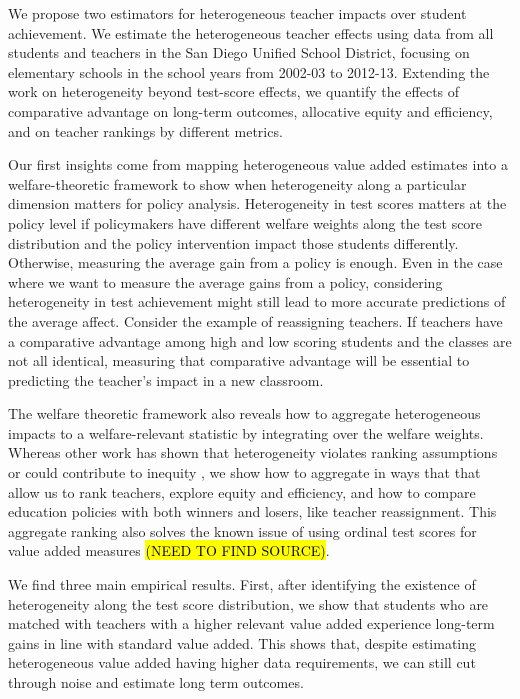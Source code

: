 \documentclass[12pt]{article}
\theoremstyle{definition}
\theoremstyle{definition}
\theoremstyle{definition}
\theoremstyle{definition}
\begin{document}
    We propose two estimators for heterogeneous teacher impacts over student achievement. We estimate the heterogeneous teacher effects using data from all students and teachers in the San Diego Unified School District, focusing on elementary schools in the school years from 2002-03 to 2012-13. Extending the work on heterogeneity beyond test-score effects, we quantify the effects of comparative advantage on long-term outcomes, allocative equity and efficiency, and on teacher rankings by different metrics.
    
    Our first insights come from mapping heterogeneous value added estimates into a welfare-theoretic framework to show when heterogeneity along a particular dimension matters for policy analysis. Heterogeneity in test scores matters at the policy level if policymakers have different welfare weights along the test score distribution and the policy intervention impact those students differently. Otherwise, measuring the average gain from a policy is enough. Even in the case where we want to measure the average gains from a policy, considering heterogeneity in test achievement might still lead to more accurate predictions of the average affect. Consider the example of reassigning teachers. If teachers have a comparative advantage among high and low scoring students and the classes are not all identical, measuring that comparative advantage will be essential to predicting the teacher's impact in a new classroom.
    
    The welfare theoretic framework also reveals how to aggregate heterogeneous impacts to a welfare-relevant statistic by integrating over the welfare weights. Whereas other work has shown that heterogeneity violates ranking assumptions \citep{condie2014teacher} or could contribute to inequity \citep{Delgado2020,bates2022teacher}, we show how to aggregate in ways that that allow us to rank teachers, explore equity and efficiency, and how to compare education policies with both winners and losers, like teacher reassignment. This aggregate ranking also solves the known issue of using ordinal test scores for value added measures \hl{(NEED TO FIND SOURCE)}. 
    
    We find three main empirical results. First, after identifying the existence of heterogeneity along the test score distribution, we show that students who are matched with teachers with a higher relevant value added experience long-term gains in line with standard value added. This shows that, despite estimating heterogeneous value added having higher data requirements, we can still cut through noise and estimate long term outcomes.
    
\end{document}

